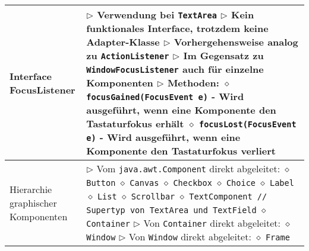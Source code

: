 \begin{longtable}{ | p{} p{} | }
	\makecell[l]{Interface \\ FocusListener} & \makecell[l]{
	$\triangleright$ Verwendung bei \texttt{TextArea} \\
	$\triangleright$ Kein funktionales Interface, trotzdem keine Adapter-Klasse \\
	$\triangleright$ Vorhergehensweise analog zu \texttt{ActionListener} \\
	$\triangleright$ Im Gegensatz zu \texttt{WindowFocusListener} auch für einzelne Komponenten \\
	$\triangleright$ Methoden: \\
	\hspace{0.4cm} $\diamond$ \texttt{focusGained(FocusEvent e)} \\ 
	\hspace{0.6cm} - Wird ausgeführt, wenn eine Komponente den Tastaturfokus erhält \\
	\hspace{0.4cm} $\diamond$ \texttt{focusLost(FocusEvent e)} \\
	\hspace{0.6cm} - Wird ausgeführt, wenn eine Komponente den Tastaturfokus verliert} \\ \hline

	\makecell[l]{Hierarchie graphischer \\ Komponenten} & \makecell[l]{
	$\triangleright$ Vom \texttt{java.awt.Component} direkt abgeleitet: \\
	\hspace{0.4cm} $\diamond$ \texttt{Button} \\
	\hspace{0.4cm} $\diamond$ \texttt{Canvas} \\
	\hspace{0.4cm} $\diamond$ \texttt{Checkbox} \\
	\hspace{0.4cm} $\diamond$ \texttt{Choice} \\
	\hspace{0.4cm} $\diamond$ \texttt{Label} \\
	\hspace{0.4cm} $\diamond$ \texttt{List} \\
	\hspace{0.4cm} $\diamond$ \texttt{Scrollbar} \\
	\hspace{0.4cm} $\diamond$ \texttt{TextComponent // Supertyp von TextArea und TextField} \\
	\hspace{0.4cm} $\diamond$ \texttt{Container}
	$\triangleright$ Von \texttt{Container} direkt abgeleitet: \\
	\hspace{0.4cm} $\diamond$ \texttt{Window} \\
	$\triangleright$ Von \texttt{Window} direkt abgeleitet: \\
	\hspace{0.4cm} $\diamond$ \texttt{Frame} } \\ \hline



\end{longtable}
